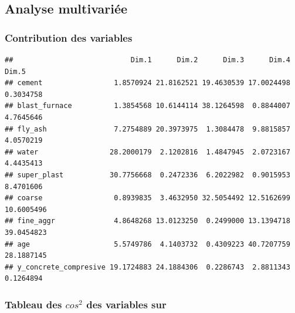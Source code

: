 \documentclass[
  12pt,
]{article}
\newenvironment{Shaded}{\begin{snugshade}}{\end{snugshade}}
\newcommand{\AttributeTok}[1]{\textcolor[rgb]{0.13,0.29,0.53}{#1}}
\newcommand{\CommentTok}[1]{\textcolor[rgb]{0.56,0.35,0.01}{\textit{#1}}}
\newcommand{\FloatTok}[1]{\textcolor[rgb]{0.00,0.00,0.81}{#1}}
\newcommand{\FunctionTok}[1]{\textcolor[rgb]{0.13,0.29,0.53}{\textbf{#1}}}
\newcommand{\NormalTok}[1]{#1}
\newcommand{\OtherTok}[1]{\textcolor[rgb]{0.56,0.35,0.01}{#1}}
\newcommand{\SpecialCharTok}[1]{\textcolor[rgb]{0.81,0.36,0.00}{\textbf{#1}}}
\begin{document}
\subsection{Analyse multivariée}\label{analyse-multivariuxe9e}

\subsubsection{Contribution des
variables}\label{contribution-des-variables}

\begin{Shaded}
\end{Shaded}

\begin{verbatim}
##                            Dim.1      Dim.2      Dim.3      Dim.4      Dim.5
## cement                 1.8570924 21.8162521 19.4630539 17.0024498  0.3034758
## blast_furnace          1.3854568 10.6144114 38.1264598  0.8844007  4.7645646
## fly_ash                7.2754889 20.3973975  1.3084478  9.8815857  4.0570219
## water                 28.2000179  2.1202816  1.4847945  2.0723167  4.4435413
## super_plast           30.7756668  0.2472336  6.2022982  0.9015953  8.4701606
## coarse                 0.8939835  3.4632950 32.5054492 12.5162699 10.6005496
## fine_aggr              4.8648268 13.0123250  0.2499000 13.1394718 39.0454823
## age                    5.5749786  4.1403732  0.4309223 40.7207759 28.1887145
## y_concrete_compresive 19.1724883 24.1884306  0.2286743  2.8811343  0.1264894
\end{verbatim}

\subsubsection{\texorpdfstring{Tableau des \(cos^2\) des variables
sur}{Tableau des cos\^{}2 des variables sur}}\label{tableau-des-cos2-des-variables-sur}

\begin{Shaded}
\end{Shaded}
\end{document}
